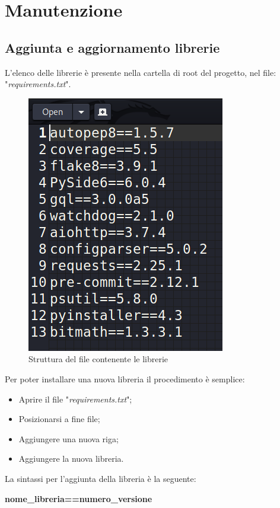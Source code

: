 \section{Manutenzione}

\subsection{Aggiunta e aggiornamento librerie}

L'elenco delle librerie è presente nella cartella di root del progetto, nel file: "\textit{requirements.txt}".

\begin{figure}[H]
    \centering
    \includegraphics[scale = 0.5]{components/img/requirements.png}
    \caption{Struttura del file contenente le librerie}
    \label{fig:Struttura del file contentente le librerie}
\end{figure}
Per poter installare una nuova libreria il procedimento è semplice:
\begin{itemize}
	\item Aprire il file "\textit{requirements.txt}";
	\item Posizionarsi a fine file;
	\item Aggiungere una nuova riga;
	\item Aggiungere la nuova libreria.
\end{itemize}
La sintassi per l'aggiunta della libreria è la seguente:
\newline{} \centerline{\textbf{nome\_libreria==numero\_versione}}\newline{} 
\subsection{}